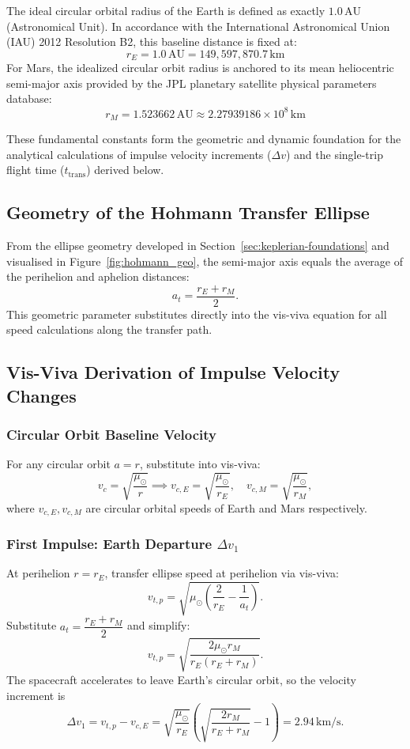 \documentclass[11pt,a4paper]{article}
\begin{document}
The ideal circular orbital radius of the Earth is defined as exactly $1.0 \, \text{AU}$ (Astronomical Unit). In accordance with the International Astronomical Union (IAU) 2012 Resolution B2, this baseline distance is fixed at:
\begin{equation}
    r_E = 1.0 \, \text{AU} = 149,597,870.7 \, \text{km}
\end{equation}
For Mars, the idealized circular orbit radius is anchored to its mean heliocentric semi-major axis provided by the JPL planetary satellite physical parameters database:
\begin{equation}
    r_M = 1.523662 \, \text{AU} \approx 2.27939186 \times 10^8 \, \text{km}
\end{equation}

These fundamental constants form the geometric and dynamic foundation for the analytical calculations of impulse velocity increments ($\Delta v$) and the single-trip flight time ($t_{\text{trans}}$) derived below.

\subsection{Geometry of the Hohmann Transfer Ellipse}
From the ellipse geometry developed in Section~\ref{sec:keplerian-foundations} and visualised in Figure~\ref{fig:hohmann_geo}, the semi-major axis equals the average of the perihelion and aphelion distances:
\[
a_t=\frac{r_E+r_M}{2}.
\]
This geometric parameter substitutes directly into the vis-viva equation for all speed calculations along the transfer path.

\subsection{Vis-Viva Derivation of Impulse Velocity Changes}
\subsubsection{Circular Orbit Baseline Velocity}
For any circular orbit $a=r$, substitute into vis-viva:
\[
v_c=\sqrt{\frac{\mu_\odot}{r}} \implies v_{c,E}=\sqrt{\frac{\mu_\odot}{r_E}},\quad v_{c,M}=\sqrt{\frac{\mu_\odot}{r_M}},
\]
where $v_{c,E},v_{c,M}$ are circular orbital speeds of Earth and Mars respectively.
\subsubsection{First Impulse: Earth Departure $\Delta v_1$}
At perihelion $r=r_E$, transfer ellipse speed at perihelion via vis-viva:
\[
v_{t,p}=\sqrt{\mu_\odot\left(\frac{2}{r_E}-\frac{1}{a_t}\right)}.
\]
Substitute $a_t=\dfrac{r_E+r_M}{2}$ and simplify:
\[
v_{t,p}=\sqrt{\frac{2\mu_\odot r_M}{r_E(r_E+r_M)}}.
\]
The spacecraft accelerates to leave Earth’s circular orbit, so the velocity increment is
\[
\Delta v_1=v_{t,p}-v_{c,E}=\sqrt{\frac{\mu_\odot}{r_E}}\left(\sqrt{\frac{2r_M}{r_E+r_M}}-1\right)=2.94\, \text{km/s}.
\]
\end{document}
